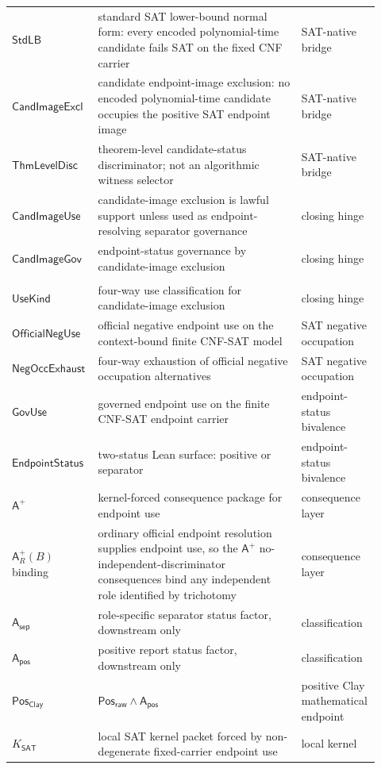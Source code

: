 \documentclass[11pt]{article}
\theoremstyle{definition}
\theoremstyle{remark}
\newcommand{\PosRaw}{\mathsf{Pos}_{\mathsf{raw}}}
\newcommand{\Asep}{\mathsf{A}_{\mathsf{sep}}}
\newcommand{\Apos}{\mathsf{A}_{\mathsf{pos}}}
\newcommand{\PosClay}{\mathsf{Pos}_{\mathsf{Clay}}}
\newcommand{\Aplus}{\mathsf{A}^{+}}
\newcommand{\StdLB}{\mathsf{StdLB}}
\newcommand{\CandImageExcl}{\mathsf{CandImageExcl}}
\newcommand{\ThmLevelDisc}{\mathsf{ThmLevelDisc}}
\newcommand{\CandImageGov}{\mathsf{CandImageGov}}
\newcommand{\KSAT}{K_{\mathsf{SAT}}}
\begin{document}
\begin{longtable}{>{\raggedright\arraybackslash}p{0.21\linewidth}>{\raggedright\arraybackslash}p{0.54\linewidth}>{\raggedright\arraybackslash}p{0.17\linewidth}}
\(\StdLB\) & standard SAT lower-bound normal form: every encoded polynomial-time candidate fails SAT on the fixed CNF carrier & SAT-native bridge \\
\(\CandImageExcl\) & candidate endpoint-image exclusion: no encoded polynomial-time candidate occupies the positive SAT endpoint image & SAT-native bridge \\
\(\ThmLevelDisc\) & theorem-level candidate-status discriminator; not an algorithmic witness selector & SAT-native bridge \\
\(\mathsf{CandImageUse}\) & candidate-image exclusion is lawful support unless used as endpoint-resolving separator governance & closing hinge \\
\(\CandImageGov\) & endpoint-status governance by candidate-image exclusion & closing hinge \\
\begin{tabular}[t]{@{}l@{}}\(\mathsf{CandImage}\)\\\(\mathsf{UseKind}\)\end{tabular} & four-way use classification for candidate-image exclusion & closing hinge \\
\(\mathsf{OfficialNegUse}\) & official negative endpoint use on the context-bound finite CNF-SAT model & SAT negative occupation \\
\(\mathsf{NegOccExhaust}\) & four-way exhaustion of official negative occupation alternatives & SAT negative occupation \\
\(\mathsf{GovUse}\) & governed endpoint use on the finite CNF-SAT endpoint carrier & endpoint-status bivalence \\
\(\mathsf{EndpointStatus}\) & two-status Lean surface: positive or separator & endpoint-status bivalence \\
\(\Aplus\) & kernel-forced consequence package for endpoint use & consequence layer \\
\(\Aplus_R(B)\) binding & ordinary official endpoint resolution supplies endpoint use, so the \(\Aplus\) no-independent-discriminator consequences bind any independent role identified by trichotomy & consequence layer \\
\(\Asep\) & role-specific separator status factor, downstream only & classification \\
\(\Apos\) & positive report status factor, downstream only & classification \\
\(\PosClay\) & \(\PosRaw\wedge\Apos\) & positive Clay mathematical endpoint \\
\(\KSAT\) & local SAT kernel packet forced by non-degenerate fixed-carrier endpoint use & local kernel \\

\end{longtable}
\end{document}
